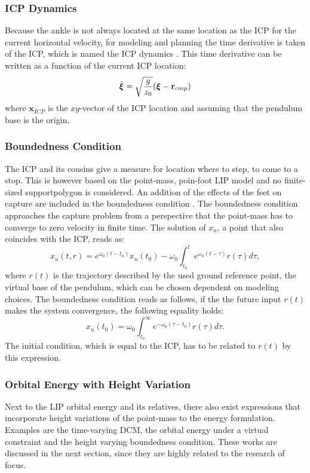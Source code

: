 \subsubsection{\ac{ICP} Dynamics}
Because the ankle is not always located at the same location as the \ac{ICP} for the current horizontal velocity, for modeling and planning the time derivative is taken of the \ac{ICP}, which is named the \ac{ICP} dynamics \cite{koolen2012capturability}. This time derivative can be written as a function of the current \ac{ICP} location:
\begin{equation}\label{eq:icpdyn}
\dot{\boldsymbol{\xi}}=\sqrt{ \frac{g}{z_0}}(\boldsymbol{\xi}-\mathbf{r}_{cmp})
\end{equation}
where $\boldsymbol{x}_{ICP}$ is the $xy$-vector of the \ac{ICP} location and assuming that the pendulum base is the origin.

\subsubsection{Boundedness Condition}
The \ac{ICP} and its cousins give a measure for location where to step, to come to a stop. This is however based on the point-mass, poin-foot \ac{LIP} model and no finite-sized supportpolygon is considered. An addition of the effects of the feet on capture  are included in the boundedness condition \cite{lanari2014boundedness}. The boundedness condition approaches the capture problem from a perspective that the point-mass has to converge to zero velocity in finite time. The solution of $x_u$, a point that also coincides with the \ac{ICP}, reads as:
\begin{equation}
x_u(t,r) = e^{\omega_0(t-t_0)}x_u(t_0) -\omega_0 \int_{t_0}^t e^{\omega_0(t-\tau)}r(\tau)d \tau,
\end{equation}
where $r(t)$ is the trajectory described by the used ground reference point, the virtual base of the pendulum, which can be chosen dependent on modeling choices. The boundedness condition reads as follows, if the the future input $r(t)$ makes the system convergence, the following equality holds:
\begin{equation}
x_u(t_0) = \omega_0 \int_{t_0}^{\infty} e^{-\omega_0(\tau-t_0)}r(\tau)d \tau.
\end{equation}
The initial condition, which is equal to the \ac{ICP}, has to be related to $r(t)$ by this expression.

\subsubsection{Orbital Energy with Height Variation}\label{subsec:nonorbit}
Next to the \ac{LIP} orbital energy and its relatives, there also exist expressions that incorporate height variations of the point-mass to the energy formulation. Examples are the time-varying \ac{DCM}, the orbital energy under a virtual constraint and the height varying boundedness condition. These works are discussed in the next section, since they are highly related to the research of focus.

